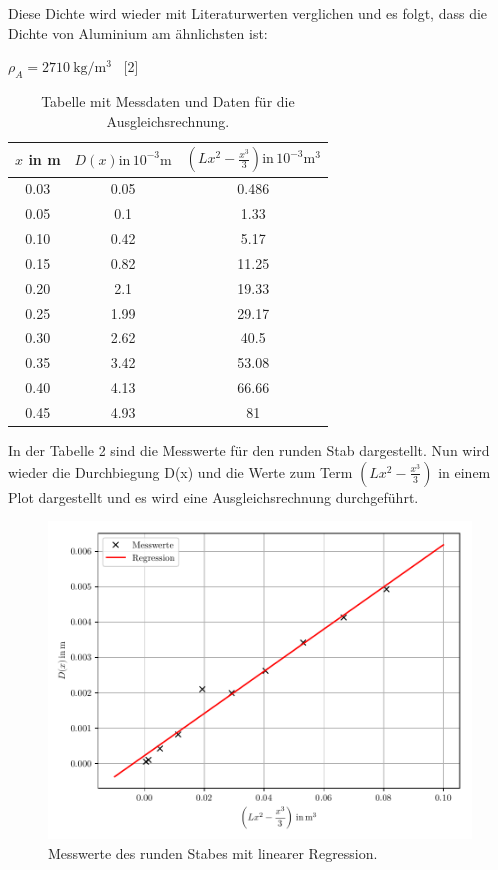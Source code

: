 Diese Dichte wird wieder mit Literaturwerten verglichen und es folgt, dass die Dichte
von Aluminium am ähnlichsten ist:\\
\centerline{$\rho_A = \SI[per-mode=fraction]{2710}{\kilo\gram\per\meter
\tothe{3}}$ \, [2]}

\begin{table}
  \centering
  \caption{Tabelle mit Messdaten und Daten für die Ausgleichsrechnung.}
  \begin{tabular}{c c c}
  \toprule
  $x$ in \si{\meter} & $D(x) \text{in} \, 10^{-3}\si{\meter}$ & $\left(Lx^2-\frac{x^3}{3}\right) \text{in} \, 10^{-3}\si{\meter\tothe{3}}$ \\
  \midrule
  0.03 & 0.05 &   0.486 \\
  0.05 & 0.1 & 1.33 \\
  0.10 & 0.42 &   5.17 \\
  0.15 & 0.82 &   11.25 \\
  0.20 & 2.1  & 19.33 \\
  0.25 & 1.99 &   29.17 \\
  0.30 & 2.62 &   40.5 \\
  0.35 & 3.42 &   53.08 \\
  0.40 & 4.13 &   66.66 \\
  0.45 & 4.93 &   81 \\
  \bottomrule
  \end{tabular}
\end{table}

In der Tabelle 2 sind die Messwerte für den runden Stab dargestellt. Nun wird wieder
die Durchbiegung D(x) und die Werte zum Term $\left(Lx^2-\frac{x^3}{3}\right)$ in
einem Plot dargestellt und es wird eine Ausgleichsrechnung durchgeführt.

\begin{figure}[H]
  \centering
  \includegraphics[width=\textwidth]{ausgleichsgerade2.pdf}
  \caption{Messwerte des runden Stabes mit linearer Regression.}
\end{figure}

